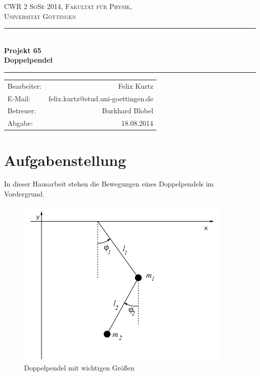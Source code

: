 \documentclass[12pt,a4paper,titlepage,headinclude,bibtotoc]{scrartcl}
\begin{document}
\begin{titlepage}
\centering
\textsc{\Large CWR 2 SoSe 2014, Fakultät für
  Physik,\\[1.5ex] Universität Göttingen}

\vspace*{4.2cm}

\rule{\textwidth}{1pt}\\[0.5cm]
{\huge \bfseries
  Projekt 65\\[1.5ex]
  Doppelpendel}\\[0.5cm]
\rule{\textwidth}{1pt}

\vspace*{3.0cm}

\begin{Large}
\begin{tabular}{lr}
 Bearbeiter:  &  Felix Kurtz\\
 E-Mail: &  felix.kurtz@stud.uni-goettingen.de\\
 Betreuer: & Burkhard Blobel \\
 Abgabe: & 18.08.2014\\
\end{tabular}
\end{Large}

\vspace*{0.8cm}
\begin{Large}
\end{Large}

\end{titlepage}

\tableofcontents

\newpage

\section{Aufgabenstellung}
In dieser Hausarbeit stehen die Bewegungen eines Doppelpendels im Vordergrund.\\
\begin{figure}[!htb]
	\centering	
	\includegraphics[scale=0.8]{doppelpendel.png}
	\caption{Doppelpendel mit wichtigen Größen \protect\footnotemark}
\end{figure}
\end{document}
